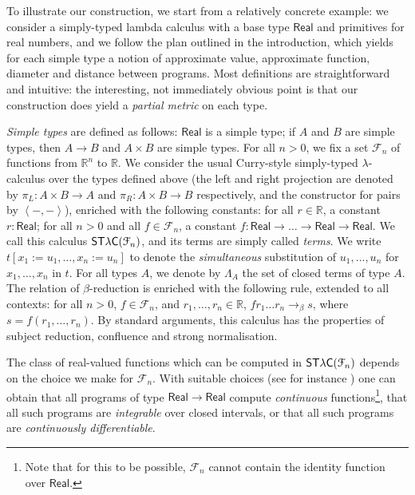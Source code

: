 
To illustrate our construction, we start from a relatively concrete example: we consider a simply-typed lambda calculus with a base type $\mathsf{Real}$ and primitives for real numbers, and we follow the plan outlined in the introduction, which yields for each simple type a notion of approximate value, approximate function, diameter and distance between programs. Most definitions are straightforward and intuitive: the interesting, not immediately obvious point is that our construction does yield a \emph{partial metric} on each type.

\emph{Simple types} are defined as follows: $\mathsf{Real}$ is a simple type; if $A$ and $B$ are simple types, then $A \to B$ and $A \times B$ are simple types.
For all $n>0$, we fix a set $\mathcal{F}_n$ of functions from $\mathbb{R}^n$ to $\mathbb{R}$. We consider the usual Curry-style simply-typed $\lambda$-calculus over the types defined above (the left and right projection are denoted by $\pi_L:A\times B \to A$ and  $\pi_R:A\times B \to B$ respectively, and the constructor for pairs by $\left\langle-,-\right\rangle$), enriched with the following constants: for all $r \in \mathbb{R}$, a constant $r:\mathsf{Real}$; for all $n>0$ and all $f\in\mathcal{F}_n$, a constant $f:\mathsf{Real}\to\ldots\to\mathsf{Real}\to\mathsf{Real}$. We call this calculus $\mathsf{ST\lambda C}(\mathcal F_{n})$, and its terms are simply called \emph{terms}. We write $t[x_1 := u_1, \ldots, x_n := u_n]$ to denote the \emph{simultaneous} substitution of $u_1, \ldots, u_n$ for $x_1, \ldots, x_n$ in $t$. For all types $A$, we denote by $\Lambda_A$ the set of closed terms of type $A$. The relation of $\beta$-reduction is enriched with the following rule, extended to all contexts: for all $n>0$, $f\in\mathcal{F}_n$, and $r_1,\ldots,r_n\in\mathbb{R}$, $f r_1 \ldots r_n \to_\beta s$, where $s = f(r_1, \ldots, r_n)$. By standard arguments, this calculus has the properties of subject reduction, confluence and strong normalisation.

\begin{remark}\label{rem:continuous}
The class of real-valued functions which can be computed in $\mathsf{ST\lambda C}(\mathcal F_{n})$ depends on the choice we make for $\mathcal F_{n}$. With suitable choices (see for instance \cite{TaylorReal, Di-Gianantonio:2013aa,Edalat:2000aa}) one can obtain that all programs of type $\mathsf{Real}\to \mathsf{Real}$ compute \emph{continuous} functions\footnote{Note that for this to be possible, $\mathcal F_{n}$ cannot contain the identity function over $\mathsf{Real}$.}, that all such programs are \emph{integrable} over closed intervals, or that all such programs are \emph{continuously differentiable}.



\end{remark}

